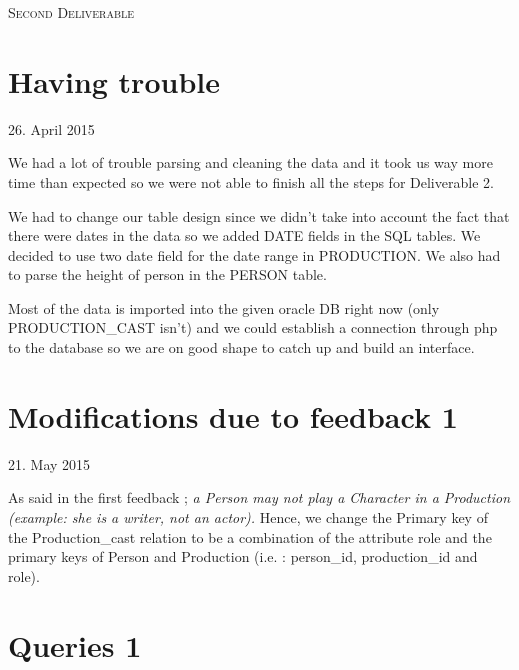 \documentclass{article}
\begin{document}
\newpage
\begin{center}
    \textsc{\LARGE Second Deliverable}\\[1.5cm]
\end{center}

\section{Having trouble}

\begin{flushright}
26. April 2015
\end{flushright}

\par We had a lot of trouble parsing and cleaning the data and it took us way more time than expected so we were not able to finish all the steps for Deliverable 2.
\vspace{3mm}
\par We had to change our table design since we didn't take into account the fact that there were dates in the data so we added DATE fields in the SQL tables. We decided to use
two date field for the date range in PRODUCTION. We also had to parse the height of person in the PERSON table.
\vspace{3mm}
\par Most of the data is imported into the given oracle DB right now (only PRODUCTION\_CAST isn't) and we could establish a connection through php to the database so we are on
good shape to catch up and build an interface.
\vspace{8mm}

\section{Modifications due to feedback 1}

\begin{flushright}
21. May 2015
\end{flushright}

\par As said in the first feedback ; \textit{ a Person may not play a Character in a Production (example: she is a writer, not an actor).}
Hence, we change the Primary key of the Production\_cast relation to be a combination of the attribute role and the primary keys of Person and Production (i.e. : person\_id, production\_id and role).

\vspace{5mm}
\section{Queries 1}
\end{document}
